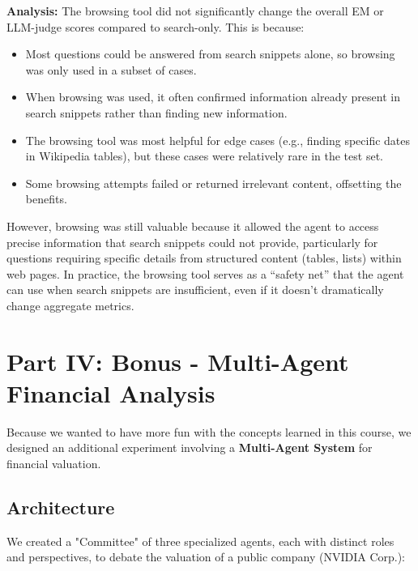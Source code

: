 \documentclass{article}
\begin{document}
\textbf{Analysis:} The browsing tool did not significantly change the overall EM or LLM-judge scores compared to search-only. This is because:

\begin{itemize}
    \item Most questions could be answered from search snippets alone, so browsing was only used in a subset of cases.
    \item When browsing was used, it often confirmed information already present in search snippets rather than finding new information.
    \item The browsing tool was most helpful for edge cases (e.g., finding specific dates in Wikipedia tables), but these cases were relatively rare in the test set.
    \item Some browsing attempts failed or returned irrelevant content, offsetting the benefits.
\end{itemize}

However, browsing was still valuable because it allowed the agent to access precise information that search snippets could not provide, particularly for questions requiring specific details from structured content (tables, lists) within web pages. In practice, the browsing tool serves as a ``safety net'' that the agent can use when search snippets are insufficient, even if it doesn't dramatically change aggregate metrics.

\section{Part IV: Bonus - Multi-Agent Financial Analysis}

Because we wanted to have more fun with the concepts learned in this course, we designed an additional experiment involving a \textbf{Multi-Agent System} for financial valuation. 

\subsection{Architecture}

We created a "Committee" of three specialized agents, each with distinct roles and perspectives, to debate the valuation of a public company (NVIDIA Corp.):
\end{document}

